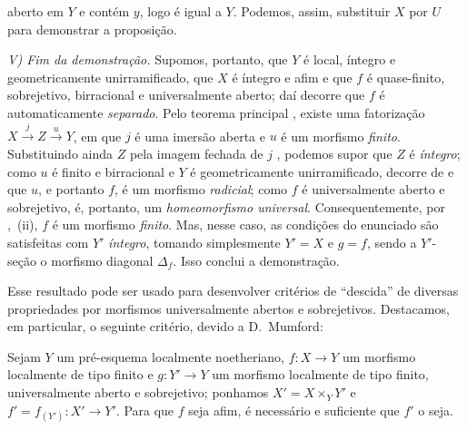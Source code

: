 
aberto em $Y$ e contém $y$, logo é igual a $Y$.
Podemos, assim, substituir $X$ por $U$ para demonstrar a proposição.

\emph{V) Fim da demonstração.}
Supomos, portanto, que $Y$ é local, íntegro e geometricamente unirramificado, que $X$ é íntegro e afim e que $f$ é quase-finito, sobrejetivo, birracional e universalmente aberto; daí decorre que $f$ é automaticamente \emph{separado}.
Pelo teorema principal , existe uma fatorização $X\xrightarrow{j}Z\xrightarrow{u}Y$, em que $j$ é uma imersão aberta e $u$ é um morfismo \emph{finito}.
Substituindo ainda $Z$ pela imagem fechada de $j$ , podemos supor que $Z$ é \emph{íntegro}; como $u$ é finito e birracional e $Y$ é geometricamente unirramificado, decorre de  e  que $u$, e portanto $f$, é um morfismo \emph{radicial}; como $f$ é universalmente aberto e sobrejetivo, é, portanto, um \emph{homeomorfismo universal}.
Consequentemente, por ,~(ii), $f$ é um morfismo \emph{finito}.
Mas, nesse caso, as condições do enunciado são satisfeitas com $Y'$ \emph{íntegro}, tomando simplesmente $Y'=X$ e $g=f$, sendo a $Y'$-seção o morfismo diagonal $\Delta_f$.
Isso conclui a demonstração.

Esse resultado pode ser usado para desenvolver critérios de ``descida'' de diversas propriedades por morfismos universalmente abertos e sobrejetivos.
Destacamos, em particular, o seguinte critério, devido a D.~Mumford:

\begin{corollary}[14.5.11]
\label{IV.14.5.11}
Sejam $Y$ um pré-esquema localmente noetheriano, $f:X\to Y$ um morfismo localmente de tipo finito e $g:Y'\to Y$ um morfismo localmente de tipo finito, universalmente aberto e sobrejetivo; ponhamos $X'=X\times_Y Y'$ e $f'=f_{(Y')}:X'\to Y'$.
Para que $f$ seja afim, é necessário e suficiente que $f'$ o seja.
\end{corollary}

